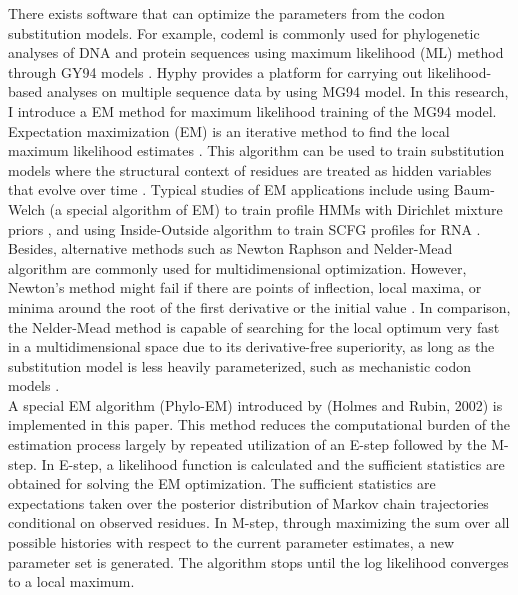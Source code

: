 \indent There exists software that can optimize the parameters from the codon substitution models. For example, codeml is commonly used for phylogenetic analyses of DNA and protein sequences using maximum likelihood (ML) method through GY94 models \parencite{yang2007paml}. Hyphy provides a platform for carrying out likelihood-based analyses on multiple sequence data by using MG94 model. In this research, I introduce a EM method for maximum likelihood training of the MG94 model. Expectation maximization (EM) is an iterative method to find the local maximum likelihood estimates \parencite{dempster1977maximum}. This algorithm can be used to train substitution models where the structural context of residues are treated as hidden variables that evolve over time \parencite{holmes2002expectation}. Typical studies of EM applications include using Baum-Welch (a special algorithm of EM) to train profile HMMs with Dirichlet mixture priors \parencite{brown1993using}, and using Inside-Outside algorithm to train SCFG profiles for RNA \parencite{durbin1998biological}. Besides, alternative methods such as Newton Raphson and Nelder-Mead algorithm are commonly used for multidimensional optimization. However, Newton's method might fail if there are points of inflection, local maxima, or minima around the root of the first derivative or the initial value \parencite{more1982newton}. In comparison, the Nelder-Mead method is capable of searching for the local optimum very fast in a multidimensional space due to its derivative-free superiority, as long as the substitution model is less heavily parameterized, such as mechanistic codon models \parencite{yu1979convergente}.\\
\indent A special EM algorithm (Phylo-EM) introduced by (Holmes and Rubin, 2002) is implemented in this paper. This method reduces the computational burden of the estimation process largely by repeated utilization of an E-step followed by the M-step. In E-step, a likelihood function is calculated and the sufficient statistics are obtained for solving the EM optimization. The sufficient statistics are expectations taken over the posterior distribution of Markov chain trajectories conditional on observed residues. In M-step, through maximizing the sum over all possible histories with respect to the current parameter estimates, a new parameter set is generated. The algorithm stops until the log likelihood converges to a local maximum. \\
